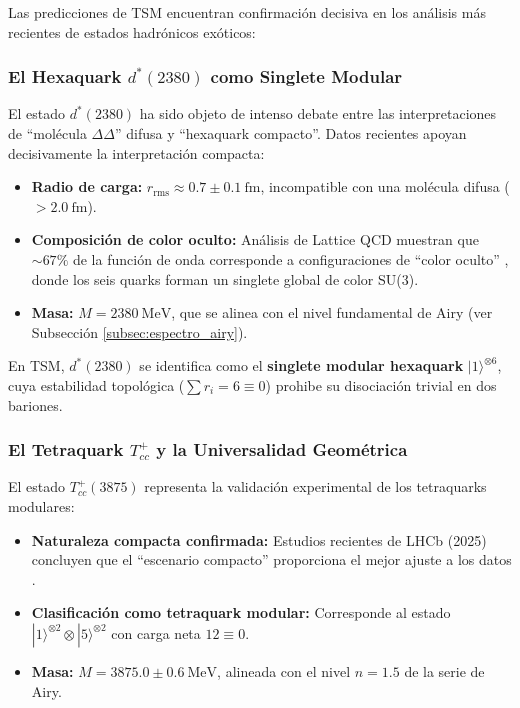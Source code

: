 \documentclass[11pt, a4paper]{article}
\theoremstyle{plain}
\theoremstyle{definition}
\begin{document}
Las predicciones de TSM encuentran confirmación decisiva en los análisis más recientes de estados hadrónicos exóticos:

\subsubsection{El Hexaquark \texorpdfstring{$d^*(2380)$}{d*(2380)} como Singlete Modular}

El estado $d^*(2380)$ ha sido objeto de intenso debate entre las interpretaciones de ``molécula $\Delta\Delta$'' difusa y ``hexaquark compacto''. Datos recientes \cite{Bashkanov2024} apoyan decisivamente la interpretación compacta:

\begin{itemize}
    \item \textbf{Radio de carga:} $r_{\text{rms}} \approx 0.7 \pm 0.1\ \si{\femto\meter}$, incompatible con una molécula difusa ($>2.0\ \si{\femto\meter}$).
    
    \item \textbf{Composición de color oculto:} Análisis de Lattice QCD muestran que $\sim 67\%$ de la función de onda corresponde a configuraciones de ``color oculto'' \cite{Lu2017}, donde los seis quarks forman un singlete global de color SU(3).
    
    \item \textbf{Masa:} $M = 2380\ \si{\mega\electronvolt}$, que se alinea con el nivel fundamental de Airy (ver Subsección \ref{subsec:espectro_airy}).
\end{itemize}

En TSM, $d^*(2380)$ se identifica como el \textbf{singlete modular hexaquark} $|1\rangle^{\otimes 6}$, cuya estabilidad topológica ($\sum r_i = 6 \equiv 0$) prohibe su disociación trivial en dos bariones.

\subsubsection{El Tetraquark \texorpdfstring{$T_{cc}^+$}{Tcc+} y la Universalidad Geométrica}

El estado $T_{cc}^+(3875)$ representa la validación experimental de los tetraquarks modulares:

\begin{itemize}
    \item \textbf{Naturaleza compacta confirmada:} Estudios recientes de LHCb (2025) concluyen que el ``escenario compacto'' proporciona el mejor ajuste a los datos \cite{Harada2025}.
    
    \item \textbf{Clasificación como tetraquark modular:} Corresponde al estado $|1\rangle^{\otimes 2} \otimes |5\rangle^{\otimes 2}$ con carga neta $12 \equiv 0$.
    
    \item \textbf{Masa:} $M = 3875.0 \pm 0.6\ \si{\mega\electronvolt}$, alineada con el nivel $n=1.5$ de la serie de Airy.
\end{itemize}
\end{document}
